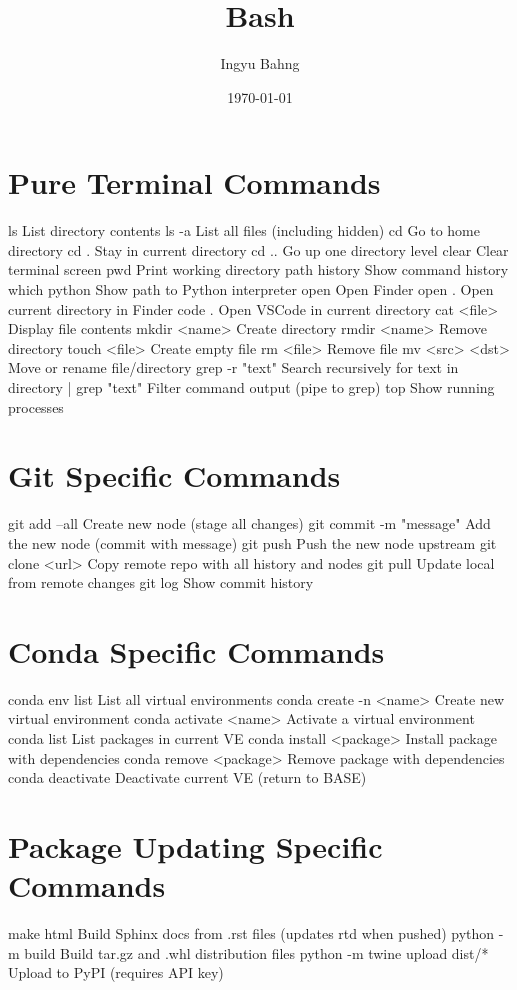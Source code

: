 \documentclass[10pt]{article}
\title{Bash}
\date{\today}
\author{Ingyu Bahng}
\begin{document}


\section{Pure Terminal Commands}

  ls              List directory contents
  ls -a           List all files (including hidden)
  cd              Go to home directory
  cd .            Stay in current directory
  cd ..           Go up one directory level
  clear           Clear terminal screen
  pwd             Print working directory path
  history         Show command history
  which python    Show path to Python interpreter
  open            Open Finder
  open .          Open current directory in Finder
  code .          Open VSCode in current directory
  cat <file>      Display file contents
  mkdir <name>    Create directory
  rmdir <name>    Remove directory
  touch <file>    Create empty file
  rm <file>       Remove file
  mv <src> <dst>  Move or rename file/directory
  grep -r "text"  Search recursively for text in directory
  | grep "text"   Filter command output (pipe to grep)
  top             Show running processes

\section{Git Specific Commands}

  git add --all                        Create new node (stage all changes)
  git commit -m "message"              Add the new node (commit with message)
  git push                             Push the new node upstream
  git clone <url>                      Copy remote repo with all history and nodes
  git pull                             Update local from remote changes
  git log                              Show commit history

\section{Conda Specific Commands}

  conda env list                       List all virtual environments
  conda create -n <name>               Create new virtual environment
  conda activate <name>                Activate a virtual environment
  conda list                           List packages in current VE
  conda install <package>              Install package with dependencies
  conda remove <package>               Remove package with dependencies
  conda deactivate                     Deactivate current VE (return to BASE)

\section{Package Updating Specific Commands}

  make html                            Build Sphinx docs from .rst files (updates rtd when pushed)
  python -m build                      Build tar.gz and .whl distribution files
  python -m twine upload dist/*        Upload to PyPI (requires API key)

 
\end{document}
